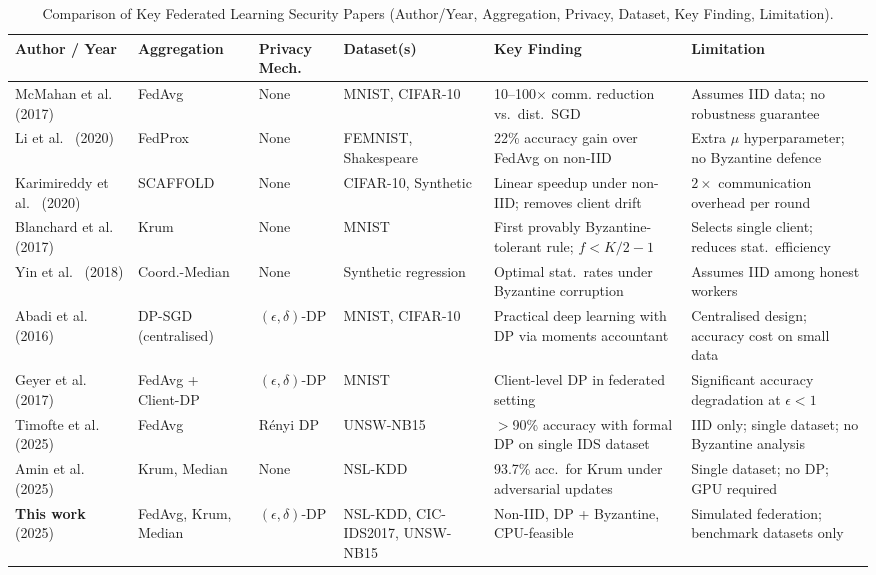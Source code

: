 \documentclass[conference]{IEEEtran}
\begin{document}
\begin{table}[!t]
\centering
\caption{Comparison of Key Federated Learning Security Papers
(Author/Year, Aggregation, Privacy, Dataset, Key Finding, Limitation).}
\label{tab:related_work_comparison}
\setlength{\tabcolsep}{4pt}
\begin{tabular}{llllp{3.2cm}p{3.0cm}}
\toprule
\textbf{Author / Year} &
\textbf{Aggregation} &
\textbf{Privacy Mech.} &
\textbf{Dataset(s)} &
\textbf{Key Finding} &
\textbf{Limitation} \\
\midrule
McMahan et al.~\cite{mcmahan2017} (2017) &
  FedAvg &
  None &
  MNIST, CIFAR-10 &
  10--100$\times$ comm. reduction vs.\ dist.\ SGD &
  Assumes IID data; no robustness guarantee \\
\addlinespace
Li et al.~\cite{li2020fedprox} (2020) &
  FedProx &
  None &
  FEMNIST, Shakespeare &
  22\% accuracy gain over FedAvg on non-IID &
  Extra $\mu$ hyperparameter; no Byzantine defence \\
\addlinespace
Karimireddy et al.~\cite{karimireddy2020scaffold} (2020) &
  SCAFFOLD &
  None &
  CIFAR-10, Synthetic &
  Linear speedup under non-IID; removes client drift &
  $2\times$ communication overhead per round \\
\addlinespace
Blanchard et al.~\cite{blanchard2017} (2017) &
  Krum &
  None &
  MNIST &
  First provably Byzantine-tolerant rule; $f < K/2-1$ &
  Selects single client; reduces stat.\ efficiency \\
\addlinespace
Yin et al.~\cite{yin2018} (2018) &
  Coord.-Median &
  None &
  Synthetic regression &
  Optimal stat.\ rates under Byzantine corruption &
  Assumes IID among honest workers \\
\addlinespace
Abadi et al.~\cite{abadi2016} (2016) &
  DP-SGD (centralised) &
  $(\epsilon,\delta)$-DP &
  MNIST, CIFAR-10 &
  Practical deep learning with DP via moments accountant &
  Centralised design; accuracy cost on small data \\
\addlinespace
Geyer et al.~\cite{geyer2017} (2017) &
  FedAvg + Client-DP &
  $(\epsilon,\delta)$-DP &
  MNIST &
  Client-level DP in federated setting &
  Significant accuracy degradation at $\epsilon < 1$ \\
\addlinespace
Timofte et al.~\cite{timofte2025} (2025) &
  FedAvg &
  R\'{e}nyi DP &
  UNSW-NB15 &
  $>$90\% accuracy with formal DP on single IDS dataset &
  IID only; single dataset; no Byzantine analysis \\
\addlinespace
Amin et al.~\cite{amin2025} (2025) &
  Krum, Median &
  None &
  NSL-KDD &
  93.7\% acc.\ for Krum under adversarial updates &
  Single dataset; no DP; GPU required \\
\addlinespace
\textbf{This work} (2025) &
  FedAvg, Krum, Median &
  $(\epsilon,\delta)$-DP &
  NSL-KDD, CIC-IDS2017, UNSW-NB15 &
  Non-IID, DP + Byzantine, CPU-feasible &
  Simulated federation; benchmark datasets only \\
\bottomrule
\end{tabular}
\end{table}
\end{document}
